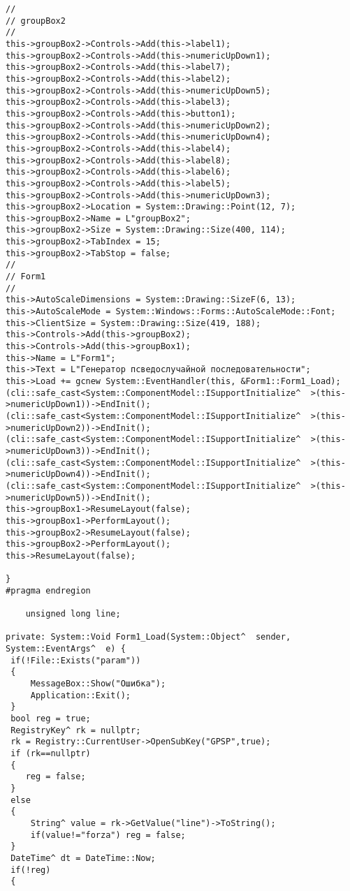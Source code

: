 \begin{lstlisting}[caption = {ОСНОВНАЯ ПОЛЕЗНАЯ ПРОГРАММА}, label = {4.cpp}]
// 
// groupBox2
// 
this->groupBox2->Controls->Add(this->label1);
this->groupBox2->Controls->Add(this->numericUpDown1);
this->groupBox2->Controls->Add(this->label7);
this->groupBox2->Controls->Add(this->label2);
this->groupBox2->Controls->Add(this->numericUpDown5);
this->groupBox2->Controls->Add(this->label3);
this->groupBox2->Controls->Add(this->button1);
this->groupBox2->Controls->Add(this->numericUpDown2);
this->groupBox2->Controls->Add(this->numericUpDown4);
this->groupBox2->Controls->Add(this->label4);
this->groupBox2->Controls->Add(this->label8);
this->groupBox2->Controls->Add(this->label6);
this->groupBox2->Controls->Add(this->label5);
this->groupBox2->Controls->Add(this->numericUpDown3);
this->groupBox2->Location = System::Drawing::Point(12, 7);
this->groupBox2->Name = L"groupBox2";
this->groupBox2->Size = System::Drawing::Size(400, 114);
this->groupBox2->TabIndex = 15;
this->groupBox2->TabStop = false;
// 
// Form1
// 
this->AutoScaleDimensions = System::Drawing::SizeF(6, 13);
this->AutoScaleMode = System::Windows::Forms::AutoScaleMode::Font;
this->ClientSize = System::Drawing::Size(419, 188);
this->Controls->Add(this->groupBox2);
this->Controls->Add(this->groupBox1);
this->Name = L"Form1";
this->Text = L"Генератор псведослучайной последовательности";
this->Load += gcnew System::EventHandler(this, &Form1::Form1_Load);
(cli::safe_cast<System::ComponentModel::ISupportInitialize^  >(this->numericUpDown1))->EndInit();
(cli::safe_cast<System::ComponentModel::ISupportInitialize^  >(this->numericUpDown2))->EndInit();
(cli::safe_cast<System::ComponentModel::ISupportInitialize^  >(this->numericUpDown3))->EndInit();
(cli::safe_cast<System::ComponentModel::ISupportInitialize^  >(this->numericUpDown4))->EndInit();
(cli::safe_cast<System::ComponentModel::ISupportInitialize^  >(this->numericUpDown5))->EndInit();
this->groupBox1->ResumeLayout(false);
this->groupBox1->PerformLayout();
this->groupBox2->ResumeLayout(false);
this->groupBox2->PerformLayout();
this->ResumeLayout(false);

}
#pragma endregion

	unsigned long line;

private: System::Void Form1_Load(System::Object^  sender, System::EventArgs^  e) {
 if(!File::Exists("param"))
 {
	 MessageBox::Show("Ошибка");
	 Application::Exit();
 }
 bool reg = true;
 RegistryKey^ rk = nullptr;
 rk = Registry::CurrentUser->OpenSubKey("GPSP",true);
 if (rk==nullptr)
 {
	reg = false;
 }
 else
 {
	 String^ value = rk->GetValue("line")->ToString();
	 if(value!="forza") reg = false; 
 }
 DateTime^ dt = DateTime::Now;
 if(!reg)
 {
	 

\end{lstlisting}
